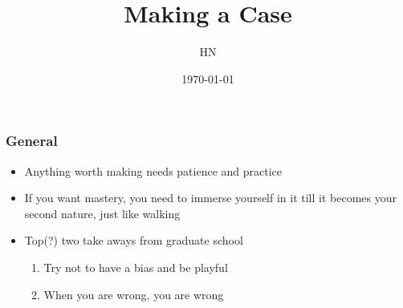 \documentclass[serif, xcolor={dvipsnames}]{beamer} %
\title{Making a Case}
\author{HN}
\institute[WSU]{Washington State University}
\date{\today}
\newcommand\dangersign[1][2ex]{%
  \renewcommand\stacktype{L}%
  \scaleto{\stackon[1.3pt]{\color{red}$\triangle$}{\tiny !}}{#1}%
}
\newcommand{\Rq}{{\faSearch~}}
\begin{document}
\maketitle



\begin{frame}
\frametitle{General}

\begin{itemize}
\item Anything worth making needs patience and practice
\item If you want mastery, you need to immerse yourself in it till it becomes your second nature, just like walking

\vspace{.5in}
\item Top(?) two take aways from graduate school
\begin{enumerate}
\item Try not to have a bias and be playful \Rq
\item When you are wrong, you are wrong \dangersign
\end{enumerate}
\end{itemize}
\end{frame}
\end{document}
